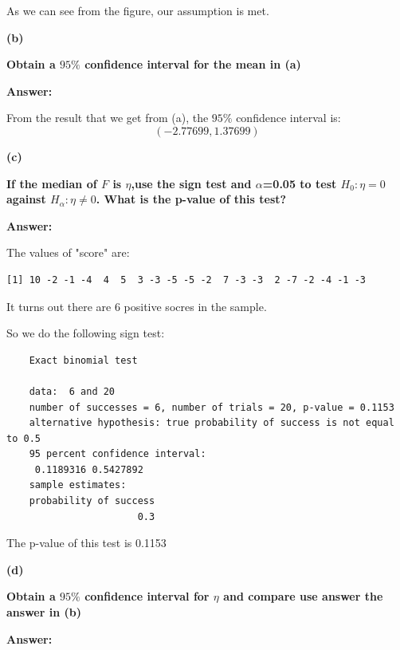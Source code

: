 \documentclass[letterpaper,11pt]{article}
\begin{document}
As we can see from the figure, our assumption is met.


  \bigbreak
  \begin{addmargin}[-1.1em]{0em}
  \textbf{(b)}\par\end{addmargin}
    \textbf{Obtain a $95\%$ confidence interval for the mean in (a) }\par
  \bigbreak
  \begin{addmargin}[-0.5em]{0em}
  \textbf{Answer: }\end{addmargin}

From the result that we get from (a), the $95\%$ confidence interval is:
$$(-2.77699, 1.37699)$$

  \bigbreak
  \begin{addmargin}[-1.1em]{0em}
  \textbf{(c)}\par\end{addmargin}
    \textbf{If the median of $F$ is $\eta$,use the sign test and $\alpha$=0.05 to test $H_0: \eta=0$ against $H_\alpha: \eta\neq 0$. What is the p-value of this test?}\par
  \bigbreak
  \begin{addmargin}[-0.5em]{0em}
  \textbf{Answer: }\end{addmargin}
The values of "score" are:
\begin{lstlisting}
[1] 10 -2 -1 -4  4  5  3 -3 -5 -5 -2  7 -3 -3  2 -7 -2 -4 -1 -3
\end{lstlisting}
It turns out there are 6 positive socres in the sample. \par
So we do the following sign test:

  \begin{lstlisting}
    Exact binomial test

    data:  6 and 20
    number of successes = 6, number of trials = 20, p-value = 0.1153
    alternative hypothesis: true probability of success is not equal to 0.5
    95 percent confidence interval:
     0.1189316 0.5427892
    sample estimates:
    probability of success
                       0.3

  \end{lstlisting}
The p-value of this test is 0.1153

  \bigbreak
  \begin{addmargin}[-1.1em]{0em}
  \textbf{(d)}\par\end{addmargin}
    \textbf{Obtain a $95\%$ confidence interval for $\eta$ and compare use answer the answer in (b)}\par
  \bigbreak
  \begin{addmargin}[-0.5em]{0em}
  \textbf{Answer: }\end{addmargin}
\end{document}
